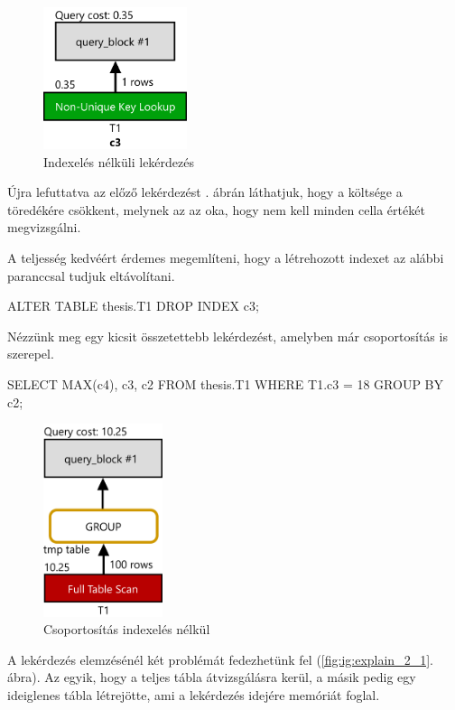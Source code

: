 \begin{figure}[h!]
\centering
\includegraphics[width=4.2cm]{images/explain/1-2.png}
\caption{Indexelés nélküli lekérdezés}
\label{fig:explain_1_2}
\end{figure}
Újra lefuttatva az előző lekérdezést . ábrán láthatjuk, hogy a költsége a töredékére csökkent, melynek az az oka, hogy nem kell minden cella értékét megvizsgálni.

A teljesség kedvéért érdemes megemlíteni, hogy a létrehozott indexet az alábbi paranccsal tudjuk eltávolítani.
\begin{python} 
ALTER TABLE thesis.T1 DROP INDEX c3;
\end{python}

\newpage


Nézzünk meg egy kicsit összetettebb lekérdezést, amelyben már csoportosítás is szerepel.
\begin{python} 
SELECT MAX(c4), c3, c2 FROM thesis.T1 WHERE T1.c3 = 18 GROUP BY c2;
\end{python}

\begin{figure}[h!]
\centering
\includegraphics[width=3.5cm]{images/explain/2-1.png}
\caption{Csoportosítás indexelés nélkül}
\label{fig:explain_2_1}
\end{figure}

A lekérdezés elemzésénél két problémát fedezhetünk fel (\ref{fig:ig:explain_2_1}. ábra). Az egyik, hogy a teljes tábla átvizsgálásra kerül, a másik pedig egy ideiglenes tábla létrejötte, ami a lekérdezés idejére memóriát foglal.

